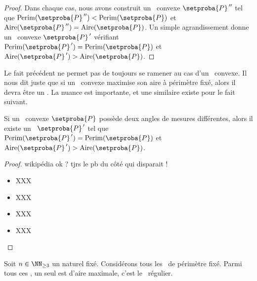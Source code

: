 \begin{proof}
	Dans chaque cas, nous avons construit un \ngone\ convexe $\setproba{P}^{\,\prime\prime}$ tel que 
	$\perim{\setproba{P}^{\,\prime\prime}} < \perim{\setproba{P}}$ 
	et 
	$\area{\setproba{P}^{\,\prime\prime}} = \area{\setproba{P}}$.
	Un simple agrandissement donne un \ngone\ convexe $\setproba{P}^{\,\prime}$ vérifiant
	$\perim{\setproba{P}^{\,\prime}} = \perim{\setproba{P}}$ 
	et 
	$\area{\setproba{P}^{\,\prime}} > \area{\setproba{P}}$.
\end{proof}


\begin{remark}
	Le fait précédent ne permet pas de toujours se ramener au cas d'un \niso\ convexe. Il nous dit juste que si un \ngone\ convexe maximise son aire à périmètre fixé, alors il devra être un \niso. La nuance est importante, et une similaire existe pour le fait suivant.
\end{remark}




\begin{fact} \label{almost-reg-poly}
	Si un \niso\  convexe $\setproba{P}$ possède deux angles de mesures différentes,
	alors il existe un \ngone\ $\setproba{P}^{\,\prime}$ tel que
	$\perim{\setproba{P}^{\,\prime}} = \perim{\setproba{P}}$ 
	et 
	$\area{\setproba{P}^{\,\prime}} > \area{\setproba{P}}$.
\end{fact}


\begin{proof}
	wikipédia ok ? tjrs le pb du côté qui disparait !
	\begin{itemize}
		\item XXX

		\item XXX

		\item XXX

		\item XXX
	\end{itemize}
\end{proof}




\begin{fact}
	Soit $n \in \NN_{\geq3}$ un naturel fixé.
	Considérons tous les \ngones\  de périmètre fixé. Parmi tous ces \ngones, un seul est d'aire maximale, c'est le \ngone\ régulier.
\end{fact}


